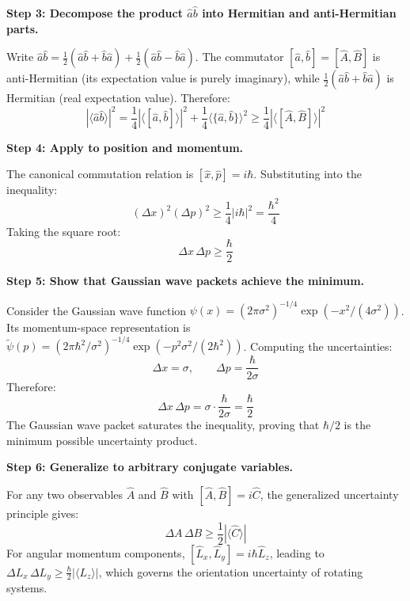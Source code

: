 \textbf{Step 3: Decompose the product $\hat{a}\hat{b}$ into Hermitian and anti-Hermitian parts.}

Write $\hat{a}\hat{b} = \frac{1}{2}(\hat{a}\hat{b} + \hat{b}\hat{a}) + \frac{1}{2}(\hat{a}\hat{b} - \hat{b}\hat{a})$. The commutator $[\hat{a},\hat{b}] = [\hat{A},\hat{B}]$ is anti-Hermitian (its expectation value is purely imaginary), while $\frac{1}{2}(\hat{a}\hat{b} + \hat{b}\hat{a})$ is Hermitian (real expectation value). Therefore:
\begin{equation}
|\langle\hat{a}\hat{b}\rangle|^2 = \frac{1}{4}|\langle[\hat{a},\hat{b}]\rangle|^2 + \frac{1}{4}\langle\{\hat{a},\hat{b}\}\rangle^2 \geq \frac{1}{4}|\langle[\hat{A},\hat{B}]\rangle|^2
\end{equation}

\textbf{Step 4: Apply to position and momentum.}

The canonical commutation relation is $[\hat{x},\hat{p}] = i\hbar$. Substituting into the inequality:
\begin{equation}
(\Delta x)^2(\Delta p)^2 \geq \frac{1}{4}|i\hbar|^2 = \frac{\hbar^2}{4}
\end{equation}
Taking the square root:
\begin{equation}
\Delta x\,\Delta p \geq \frac{\hbar}{2}
\end{equation}

\textbf{Step 5: Show that Gaussian wave packets achieve the minimum.}

Consider the Gaussian wave function $\psi(x) = (2\pi\sigma^2)^{-1/4}\exp(-x^2/(4\sigma^2))$. Its momentum-space representation is $\tilde{\psi}(p) = (2\pi\hbar^2/\sigma^2)^{-1/4}\exp(-p^2\sigma^2/(2\hbar^2))$. Computing the uncertainties:
\begin{equation}
\Delta x = \sigma, \qquad \Delta p = \frac{\hbar}{2\sigma}
\end{equation}
Therefore:
\begin{equation}
\Delta x\,\Delta p = \sigma \cdot \frac{\hbar}{2\sigma} = \frac{\hbar}{2}
\end{equation}
The Gaussian wave packet saturates the inequality, proving that $\hbar/2$ is the minimum possible uncertainty product.

\textbf{Step 6: Generalize to arbitrary conjugate variables.}

For any two observables $\hat{A}$ and $\hat{B}$ with $[\hat{A},\hat{B}] = i\hat{C}$, the generalized uncertainty principle gives:
\begin{equation}
\Delta A\,\Delta B \geq \frac{1}{2}|\langle\hat{C}\rangle|
\end{equation}
For angular momentum components, $[\hat{L}_x,\hat{L}_y] = i\hbar\hat{L}_z$, leading to $\Delta L_x\,\Delta L_y \geq \frac{\hbar}{2}|\langle L_z\rangle|$, which governs the orientation uncertainty of rotating systems.

